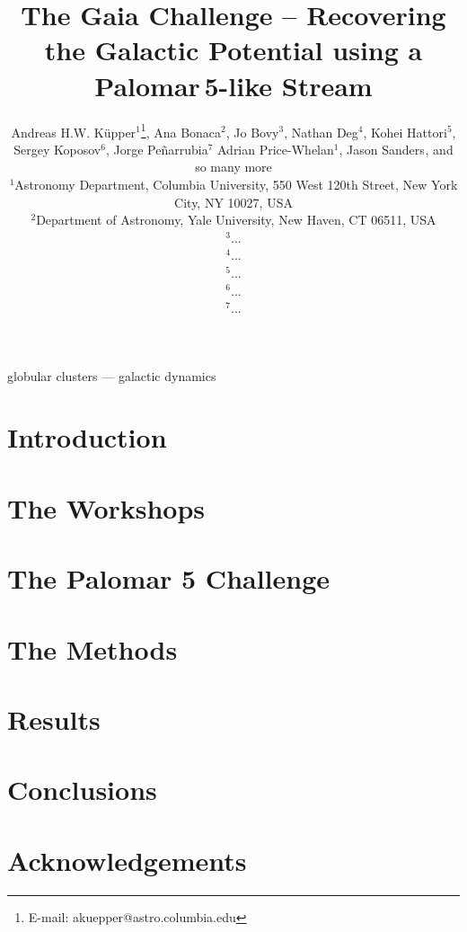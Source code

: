 \documentclass[useAMS,usenatbib]{mn2e}
\title[Gaia Challenge -- Palomar\,5]{The Gaia Challenge -- Recovering the Galactic Potential using a Palomar\,5-like Stream}
\author[K\"upper et al.]
{Andreas H.W. K\"{u}pper$^{1}$\thanks{
E-mail: \mbox{akuepper@astro.columbia.edu}}, Ana Bonaca$^{2}$, Jo Bovy$^{3}$, Nathan Deg$^{4}$, Kohei Hattori$^{5}$, \newauthor
Sergey Koposov$^{6}$, Jorge Pe\~narrubia$^{7}$ Adrian Price-Whelan$^{1}$, Jason Sanders$^{}$,\newauthor
and so many more\\
$^{1}$Astronomy Department, Columbia University, 550 West 120th Street, New York City, NY 10027, USA\\
$^{2}$Department of Astronomy, Yale University, New Haven, CT 06511, USA\\
$^{3}$...\\
$^{4}$...\\
$^{5}$...\\
$^{6}$...\\
$^{7}$...\\
}
\begin{document}


\maketitle

\label{firstpage}

\begin{abstract}

\end{abstract}




\begin{keywords}
globular clusters --- galactic dynamics
\end{keywords}





\section{Introduction}



\section{The Workshops}



\section{The Palomar 5 Challenge}



\section{The Methods}



\section{Results}



\section{Conclusions}



\section*{Acknowledgements}


\begin{thebibliography}{99}

\end{thebibliography}



\bsp \label{lastpage} 
\end{document}
